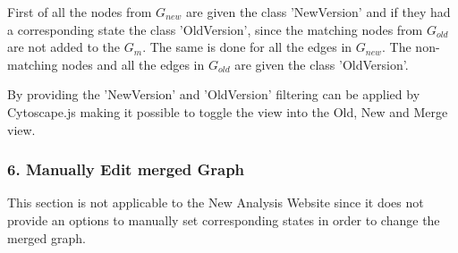 First of all the nodes from $G_{new}$ are given the class 'NewVersion' and if they had a corresponding state the class 'OldVersion', since the matching nodes from $G_{old}$ are not added to the $G_m$. The same is done for all the edges in $G_{new}$. The non-matching nodes and all the edges in $G_{old}$ are given the class 'OldVersion'.

By providing the 'NewVersion' and 'OldVersion' filtering can be applied by Cytoscape.js making it possible to toggle the view into the Old, New and Merge view. 

\subsubsection{6. Manually Edit merged Graph}

This section is not applicable to the New Analysis Website since it does not provide an options to manually set corresponding states in order to change the merged graph. 